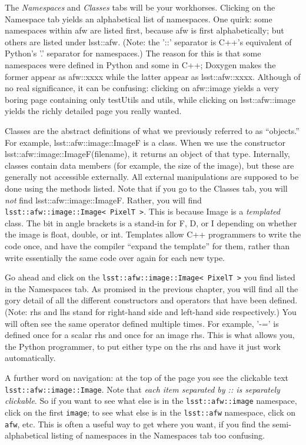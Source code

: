 \documentclass{book}
\begin{document}
The {\it Namespaces} and {\it Classes} tabs will be your workhorses.
Clicking on the Namespace tab yields an alphabetical list of
namespaces.  One quirk: some namespaces within afw are listed first,
because afw is first alphabetically; but others are listed under
lsst::afw. (Note: the '::' separator is C++'s equivalent of Python's
'.' separator for namespaces.)  The reason for this is that some
namespaces were defined in Python and some in C++; Doxygen makes the
former appear as afw::xxxx while the latter appear as lsst::afw::xxxx.
Although of no real significance, it can be confusing: clicking on
afw::image yields a very boring page containing only testUtils and
utils, while clicking on lsst::afw::image yields the richly detailed
page you really wanted.  

Classes are the abstract definitions of what we previously referred to
as ``objects.'' For example, lsst::afw::image::ImageF is a class.
When we use the constructor lsst::afw::image::ImageF(filename), it
returns an object of that type.  Internally, classes contain data
members (for example, the size of the image), but these are generally
not accessible externally.  All external manipulations are supposed to
be done using the methods listed.  Note that if you go to the Classes
tab, you will {\it not} find lsst::afw::image::ImageF. Rather, you
will find \texttt{lsst::afw::image::Image< PixelT >}.  This is
because Image is a {\it templated} class.  The bit in angle brackets
is a stand-in for F, D, or I depending on whether the image is float,
double, or int.  Templates allow C++ programmers to write the code
once, and have the compiler ``expand the template'' for them, rather
than write essentially the same code over again for each new type.

Go ahead and click on the \texttt{lsst::afw::image::Image< PixelT >}
you find listed in the Namespaces tab.  As promised in the previous
chapter, you will find all the gory detail of all the different
constructors and operators that have been defined.  (Note: rhs and lhs
stand for right-hand side and left-hand side respectively.)  You will
often see the same operator defined multiple times.  For example, '-='
is defined once for a scalar rhs and once for an image rhs.  This is
what allows you, the Python programmer, to put either type on the rhs
and have it just work automatically.

A further word on navigation: at the top of the page you see the
clickable text \texttt{lsst::afw::image::Image}.  Note that {\it each
  item separated by :: is separately clickable}.  So if you want to
see what else is in the \texttt{lsst::afw::image} namespace, click on
the first \texttt{image}; to see what else is in the
\texttt{lsst::afw} namespace, click on \texttt{afw}, etc.  This is
often a useful way to get where you want, if you find the
semi-alphabetical listing of namespaces in the Namespaces tab too
confusing.
\end{document}
